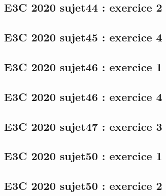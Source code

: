 \documentclass[lang=fr,edition=teacher,layout=sheet]{mxbook}
\begin{document}
\par\bigskip
{}\subsection*{E3C 2020 sujet44 : exercice 2}
\begingroup\endgroup
\par\bigskip
{}\subsection*{E3C 2020 sujet45 : exercice 4}
\begingroup\endgroup
\par\bigskip
{}\subsection*{E3C 2020 sujet46 : exercice 1}
\begingroup\endgroup
\par\bigskip
{}\subsection*{E3C 2020 sujet46 : exercice 4}
\begingroup\endgroup
\par\bigskip
{}\subsection*{E3C 2020 sujet47 : exercice 3}
\begingroup\endgroup
\par\bigskip
{}\subsection*{E3C 2020 sujet50 : exercice 1}
\begingroup\endgroup
\par\bigskip
{}\subsection*{E3C 2020 sujet50 : exercice 2}
\begingroup\endgroup
\par\bigskip
\end{document}
